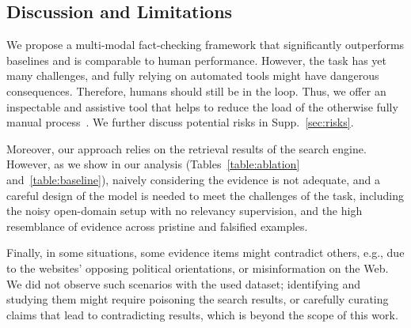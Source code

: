 \subsection{Discussion and Limitations}
We propose a multi-modal fact-checking framework  
that significantly outperforms baselines and is comparable to human performance. However, the task has yet many challenges, and fully relying on automated tools might have dangerous consequences. 
Therefore, humans should still be in the loop. Thus, we offer an inspectable and assistive tool that helps to reduce the load of the otherwise fully manual process~\cite{press_vice}. We further discuss potential risks in Supp.~\ref{sec:risks}.

Moreover, our approach relies on the retrieval results of the search engine. However, as we show in our analysis (Tables~\ref{table:ablation} and~\ref{table:baseline}), naively considering the evidence is not adequate, and a careful design of the model is needed to meet the challenges of the task, including the noisy open-domain setup with no relevancy supervision, and the high resemblance of evidence across pristine and falsified examples.

Finally, in some situations, some evidence items might contradict others, e.g., due to the websites' opposing political orientations, or misinformation on the Web. We did not observe such scenarios with the used dataset; identifying and studying them might require poisoning the search results, or carefully curating claims that lead to contradicting results, which is beyond the scope of this work.